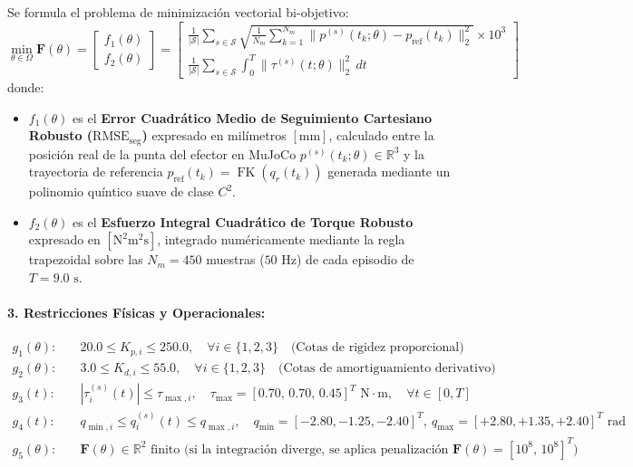 \documentclass[11pt,a4paper]{article}
\begin{document}
Se formula el problema de minimización vectorial bi-objetivo:
\begin{equation}
    \min_{\theta \in \Omega} \mathbf{F}(\theta) = \begin{bmatrix} f_1(\theta) \\[0.15cm] f_2(\theta) \end{bmatrix} = \begin{bmatrix} \displaystyle \frac{1}{|\mathcal{S}|} \sum_{s \in \mathcal{S}} \sqrt{\frac{1}{N_m} \sum_{k=1}^{N_m} \big\| p^{(s)}(t_k; \theta) - p_{\text{ref}}(t_k) \big\|_2^2} \times 10^3 \\[0.35cm] \displaystyle \frac{1}{|\mathcal{S}|} \sum_{s \in \mathcal{S}} \int_{0}^{T} \big\| \tau^{(s)}(t; \theta) \big\|_2^2 \, dt \end{bmatrix}
    \label{eq:biobjetivo}
\end{equation}
donde:
\begin{itemize}
    \item $f_1(\theta)$ es el \textbf{Error Cuadrático Medio de Seguimiento Cartesiano Robusto ($\text{RMSE}_{\text{seg}}$)} expresado en milímetros $[\text{mm}]$, calculado entre la posición real de la punta del efector en MuJoCo $p^{(s)}(t_k;\theta) \in \mathbb{R}^3$ y la trayectoria de referencia $p_{\text{ref}}(t_k) = \operatorname{FK}(q_r(t_k))$ generada mediante un polinomio quíntico suave de clase $C^2$.
    \item $f_2(\theta)$ es el \textbf{Esfuerzo Integral Cuadrático de Torque Robusto} expresado en $[\text{N}^2\text{m}^2\text{s}]$, integrado numéricamente mediante la regla trapezoidal sobre las $N_m = 450$ muestras ($50\text{ Hz}$) de cada episodio de $T = 9.0\text{ s}$.
\end{itemize}

\paragraph{3. Restricciones Físicas y Operacionales:}
\begin{align}
    g_1(\theta): &\quad 20.0 \le K_{p,i} \le 250.0, \quad \forall i \in \{1,2,3\} \quad \text{(Cotas de rigidez proporcional)} \\
    g_2(\theta): &\quad 3.0 \le K_{d,i} \le 55.0, \quad \forall i \in \{1,2,3\} \quad \text{(Cotas de amortiguamiento derivativo)} \\
    g_3(t): &\quad |\tau_i^{(s)}(t)| \le \tau_{\max,i}, \quad \tau_{\max} = [0.70,\, 0.70,\, 0.45]^T\text{ N}\cdot\text{m}, \quad \forall t \in [0, T] \\
    g_4(t): &\quad q_{\min,i} \le q_i^{(s)}(t) \le q_{\max,i}, \quad q_{\min}=[-2.80, -1.25, -2.40]^T,\ q_{\max}=[+2.80, +1.35, +2.40]^T\text{ rad} \\
    g_5(\theta): &\quad \mathbf{F}(\theta) \in \mathbb{R}^2 \text{ finito (si la integración diverge, se aplica penalización } \mathbf{F}(\theta) = [10^8,\, 10^8]^T\text{)}
\end{align}
\end{document}
